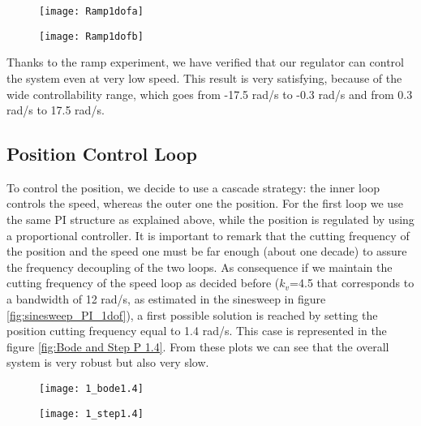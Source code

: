 \begin{figure*}[h]
	\centering
	\begin{subfigure}{0.45\columnwidth}
		\texttt{[image: Ramp1dofa]}
	\end{subfigure}
	\begin{subfigure}{0.45\columnwidth}
		\texttt{[image: Ramp1dofb]}
	\end{subfigure}
	\caption{Ramp experiment from 17 rad/s to 0 rad/s in 100s}
	\label{fig:Ramp1dof}
\end{figure*}

Thanks to the ramp experiment, we have verified that our regulator can control the system even at very low speed. This result is very satisfying, because of the wide controllability range, which goes from -17.5 rad/s to -0.3 rad/s and from 0.3 rad/s to 17.5 rad/s.

\newpage
\subsection{Position Control Loop}
To control the position, we decide to use a cascade strategy: the inner loop controls the speed, whereas the outer one the position. For the first loop we use the same PI structure as explained above, while the position is regulated by using a proportional controller. It is important to remark that the cutting frequency of the position and the speed one must be far enough (about one decade) to assure the frequency decoupling of the two loops. As consequence if we maintain the cutting frequency of the speed loop as decided before ($k_v$=4.5 that corresponds to a bandwidth of 12 rad/s, as estimated in the sinesweep in figure \ref{fig:sinesweep_PI_1dof}), a first possible solution is reached by setting the position cutting frequency equal to 1.4 rad/s. This case is represented in the figure \ref{fig:Bode and Step P 1.4}. From these plots we can see that the overall system is very robust but also very slow.

\begin{figure*}[h]
	\centering
	\begin{subfigure}{0.45\columnwidth}
		\texttt{[image: 1\_bode1.4]}
	\end{subfigure}
	\begin{subfigure}{0.45\columnwidth}
		\texttt{[image: 1\_step1.4]}
	\end{subfigure}
	\caption{Position control loop with  $wc_{p} $=1.4 rad/s}
	\label{fig:Bode and Step P 1.4}
\end{figure*}

